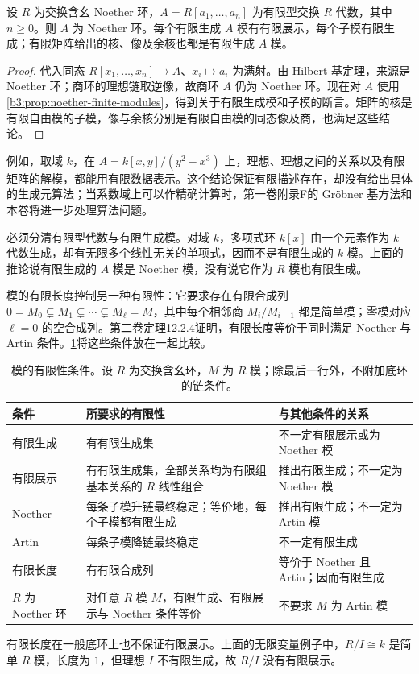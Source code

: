 \begin{corollary}\label{b3:cor:hilbert-module-consequences}
	设 \(R\) 为交换含幺 Noether 环，\(A=R[a_1,\ldots,a_n]\) 为有限型交换 \(R\) 代数，其中 \(n\ge0\)。则 \(A\) 为 Noether 环。每个有限生成 \(A\) 模有有限展示，每个子模有限生成；有限矩阵给出的核、像及余核也都是有限生成 \(A\) 模。
\end{corollary}
\begin{proof}
	代入同态 \(R[x_1,\ldots,x_n]\rightarrow A\)、\(x_i\mapsto a_i\) 为满射。由 Hilbert 基定理，来源是 Noether 环；商环的理想链取逆像，故商环 \(A\) 仍为 Noether 环。现在对 \(A\) 使用\cref{b3:prop:noether-finite-modules}，得到关于有限生成模和子模的断言。矩阵的核是有限自由模的子模，像与余核分别是有限自由模的同态像及商，也满足这些结论。
\end{proof}

例如，取域 \(k\)，在 \(A=k[x,y]/(y^2-x^3)\) 上，理想、理想之间的关系以及有限矩阵的解模，都能用有限数据表示。这个结论保证有限描述存在，却没有给出具体的生成元算法；当系数域上可以作精确计算时，第一卷附录F的 Gröbner 基方法和本卷将进一步处理算法问题。

\ProseParagraphBreak
必须分清有限型代数与有限生成模。对域 \(k\)，多项式环 \(k[x]\) 由一个元素作为 \(k\) 代数生成，却有无限多个线性无关的单项式，因而不是有限生成的 \(k\) 模。上面的推论说有限生成的 \(A\) 模是 Noether 模，没有说它作为 \(R\) 模也有限生成。

\ProseParagraphBreak
模的有限长度控制另一种有限性：它要求存在有限合成列 \(0=M_0\subsetneq M_1\subsetneq\cdots\subsetneq M_\ell=M\)，其中每个相邻商 \(M_i/M_{i-1}\) 都是简单模；零模对应 \(\ell=0\) 的空合成列。第二卷定理12.2.4证明，有限长度等价于同时满足 Noether 与 Artin 条件。\cref{b3:tab:module-finiteness}将这些条件放在一起比较。

\begin{table}[htbp]
	\centering
	\caption[模的有限性条件]{模的有限性条件。设 \(R\) 为交换含幺环，\(M\) 为 \(R\) 模；除最后一行外，不附加底环的链条件。}
	\label{b3:tab:module-finiteness}
	\begin{tabularx}{\textwidth}{@{}l>{\raggedright\arraybackslash}X>{\raggedright\arraybackslash}p{}@{}}
		\toprule
		条件 & 所要求的有限性 & 与其他条件的关系 \\
		\midrule
		有限生成 & 有有限生成集 & 不一定有限展示或为 Noether 模 \\
		有限展示 & 有有限生成集，全部关系均为有限组基本关系的 \(R\) 线性组合 & 推出有限生成；不一定为 Noether 模 \\
		Noether & 每条子模升链最终稳定；等价地，每个子模都有限生成 & 推出有限生成；不一定为 Artin 模 \\
		Artin & 每条子模降链最终稳定 & 不一定有限生成 \\
		有限长度 & 有有限合成列 & 等价于 Noether 且 Artin；因而有限生成 \\
		\midrule
		\(R\) 为 Noether 环 & 对任意 \(R\) 模 \(M\)，有限生成、有限展示与 Noether 条件等价 & 不要求 \(M\) 为 Artin 模 \\
		\bottomrule
	\end{tabularx}
\end{table}

有限长度在一般底环上也不保证有限展示。上面的无限变量例子中，\(R/I\cong k\) 是简单 \(R\) 模，长度为 \(1\)，但理想 \(I\) 不有限生成，故 \(R/I\) 没有有限展示。
